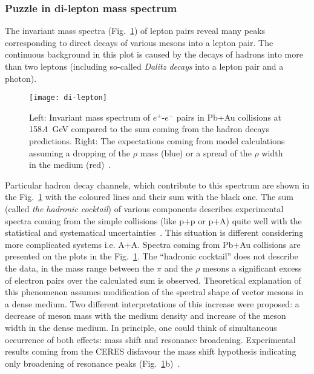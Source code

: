       \subsubsection{Puzzle in di-lepton mass spectrum}
        The invariant mass spectra (Fig.~\ref{fig:di-lepton}) of lepton pairs reveal many peaks corresponding to direct decays of various mesons into a lepton pair.
        The continuous background in this plot is caused by the decays of hadrons into more than two leptons (including so-called \textit{Dalitz decays} into a lepton pair and a photon).
        \begin{figure}[h]
          \centering
          \texttt{[image: di-lepton]}
          \caption{Left: Invariant mass spectrum of $e^{+}$-$e^{-}$ pairs in Pb+Au collisions at 158\textit{A}~GeV compared to the sum coming from the hadron decays predictions. Right: The expectations coming from model calculations assuming a dropping of the $\rho$ mass (blue) or a spread of the $\rho$ width in the medium (red)~\cite{marin}.}
          \label{fig:di-lepton}
        \end{figure}
        Particular hadron decay channels, which contribute to this spectrum are shown in the Fig.~\ref{fig:di-lepton} with the coloured lines and their sum with the black one.
        The sum (called \textit{the hadronic cocktail}) of various components describes experimental spectra coming from the simple collisions (like p+p or p+A) quite well with the statistical and systematical uncertainties~\cite{bartke}.
        This situation is different considering more complicated systems i.e. A+A.
        Spectra coming from Pb+Au collisions are presented on the plots in the Fig.~\ref{fig:di-lepton}.
        The ``hadronic cocktail'' does not describe the data, in the mass range between the $\pi$ and the $\rho$ mesons a significant excess of electron pairs over the calculated sum is observed.
        Theoretical explanation of this phenomenon assumes modification of the spectral shape of vector mesons in a dense medium.
        Two different interpretations of this increase were proposed: a decrease of meson mass with the medium density and increase of the meson width in the dense medium.
        In principle, one could think of simultaneous occurrence of both effects: mass shift and resonance broadening.
        Experimental results coming from the CERES disfavour the mass shift hypothesis indicating only broadening of resonance peaks (Fig.~\ref{fig:di-lepton}b)~\cite{bartke}.

